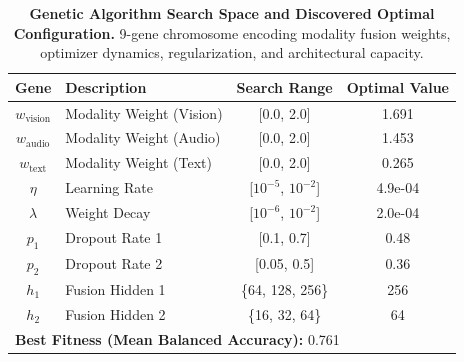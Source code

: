 \begin{table}[t]
\centering
\caption{\textbf{Genetic Algorithm Search Space and Discovered Optimal Configuration.} 9-gene chromosome encoding modality fusion weights, optimizer dynamics, regularization, and architectural capacity.}
\label{tab:ga_search_space}
\small
\begin{tabular}{clcc}
\toprule
\textbf{Gene} & \textbf{Description} & \textbf{Search Range} & \textbf{Optimal Value} \\
\midrule
$w_{\text{vision}}$ & Modality Weight (Vision) & [0.0, 2.0] & 1.691 \\
$w_{\text{audio}}$ & Modality Weight (Audio) & [0.0, 2.0] & 1.453 \\
$w_{\text{text}}$ & Modality Weight (Text) & [0.0, 2.0] & 0.265 \\
$\eta$ & Learning Rate & [$10^{-5}$, $10^{-2}$] & 4.9e-04 \\
$\lambda$ & Weight Decay & [$10^{-6}$, $10^{-2}$] & 2.0e-04 \\
$p_1$ & Dropout Rate 1 & [0.1, 0.7] & 0.48 \\
$p_2$ & Dropout Rate 2 & [0.05, 0.5] & 0.36 \\
$h_1$ & Fusion Hidden 1 & \{64, 128, 256\} & 256 \\
$h_2$ & Fusion Hidden 2 & \{16, 32, 64\} & 64 \\
\midrule
\multicolumn{4}{l}{\textbf{Best Fitness (Mean Balanced Accuracy):} 0.761} \\
\bottomrule
\end{tabular}
\end{table}
